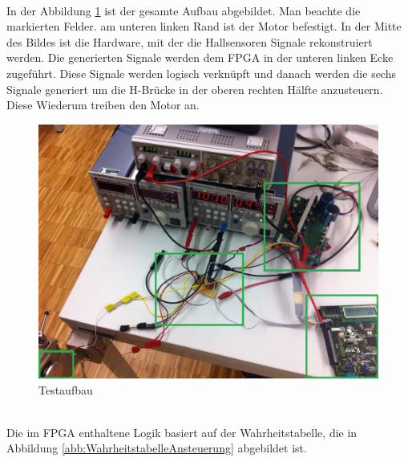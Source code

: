 \\
In der Abbildung \ref{abb:MessplatzAufbau} ist der gesamte Aufbau abgebildet. Man beachte die markierten Felder. am unteren linken Rand ist der Motor befestigt. In der Mitte des Bildes ist die Hardware, mit der die Hallsensoren Signale rekonstruiert werden. Die generierten Signale werden dem FPGA in der unteren linken Ecke zugeführt. Diese Signale werden logisch verknüpft und danach werden die sechs Signale generiert um die H-Brücke in der oberen rechten Hälfte anzusteuern. Diese Wiederum treiben den Motor an.
\begin{figure}[h!]
	\includegraphics[scale=0.14]{Funktionstests/Bilder/MessplatzAufbau.jpg}
	\centering
	\caption{Testaufbau} 
\label{abb:MessplatzAufbau}
\end{figure}\\
Die im FPGA enthaltene Logik basiert auf der Wahrheitstabelle, die in Abbildung \ref{abb:WahrheitstabelleAnsteuerung} abgebildet ist.
